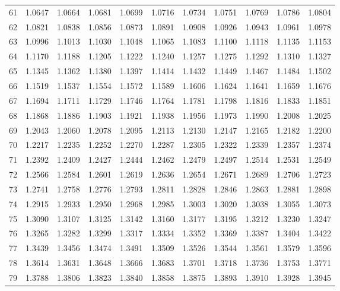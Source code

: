 {\begin{tabular}{|c|cccccccccc|}
61 & 1.0647 & 1.0664 & 1.0681 & 1.0699 & 1.0716 & 1.0734 & 1.0751 & 1.0769 & 1.0786 & 1.0804 \\
62 & 1.0821 & 1.0838 & 1.0856 & 1.0873 & 1.0891 & 1.0908 & 1.0926 & 1.0943 & 1.0961 & 1.0978 \\
63 & 1.0996 & 1.1013 & 1.1030 & 1.1048 & 1.1065 & 1.1083 & 1.1100 & 1.1118 & 1.1135 & 1.1153 \\
64 & 1.1170 & 1.1188 & 1.1205 & 1.1222 & 1.1240 & 1.1257 & 1.1275 & 1.1292 & 1.1310 & 1.1327 \\
\hline
65 & 1.1345 & 1.1362 & 1.1380 & 1.1397 & 1.1414 & 1.1432 & 1.1449 & 1.1467 & 1.1484 & 1.1502 \\
66 & 1.1519 & 1.1537 & 1.1554 & 1.1572 & 1.1589 & 1.1606 & 1.1624 & 1.1641 & 1.1659 & 1.1676 \\
67 & 1.1694 & 1.1711 & 1.1729 & 1.1746 & 1.1764 & 1.1781 & 1.1798 & 1.1816 & 1.1833 & 1.1851 \\
68 & 1.1868 & 1.1886 & 1.1903 & 1.1921 & 1.1938 & 1.1956 & 1.1973 & 1.1990 & 1.2008 & 1.2025 \\
69 & 1.2043 & 1.2060 & 1.2078 & 1.2095 & 1.2113 & 1.2130 & 1.2147 & 1.2165 & 1.2182 & 1.2200 \\
\hline
70 & 1.2217 & 1.2235 & 1.2252 & 1.2270 & 1.2287 & 1.2305 & 1.2322 & 1.2339 & 1.2357 & 1.2374 \\
71 & 1.2392 & 1.2409 & 1.2427 & 1.2444 & 1.2462 & 1.2479 & 1.2497 & 1.2514 & 1.2531 & 1.2549 \\
72 & 1.2566 & 1.2584 & 1.2601 & 1.2619 & 1.2636 & 1.2654 & 1.2671 & 1.2689 & 1.2706 & 1.2723 \\
73 & 1.2741 & 1.2758 & 1.2776 & 1.2793 & 1.2811 & 1.2828 & 1.2846 & 1.2863 & 1.2881 & 1.2898 \\
74 & 1.2915 & 1.2933 & 1.2950 & 1.2968 & 1.2985 & 1.3003 & 1.3020 & 1.3038 & 1.3055 & 1.3073 \\
\hline
75 & 1.3090 & 1.3107 & 1.3125 & 1.3142 & 1.3160 & 1.3177 & 1.3195 & 1.3212 & 1.3230 & 1.3247 \\
76 & 1.3265 & 1.3282 & 1.3299 & 1.3317 & 1.3334 & 1.3352 & 1.3369 & 1.3387 & 1.3404 & 1.3422 \\
77 & 1.3439 & 1.3456 & 1.3474 & 1.3491 & 1.3509 & 1.3526 & 1.3544 & 1.3561 & 1.3579 & 1.3596 \\
78 & 1.3614 & 1.3631 & 1.3648 & 1.3666 & 1.3683 & 1.3701 & 1.3718 & 1.3736 & 1.3753 & 1.3771 \\
79 & 1.3788 & 1.3806 & 1.3823 & 1.3840 & 1.3858 & 1.3875 & 1.3893 & 1.3910 & 1.3928 & 1.3945 \\

\end{tabular}}
